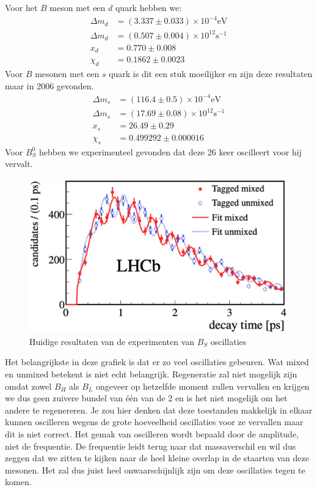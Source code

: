 \documentclass[../main.tex]{subfiles}
\begin{document}
Voor het $B$ meson met een $d$ quark hebben we:
\begin{equation}
    \begin{aligned}
        \label{eq:b_d_resultaten}
        \Delta m_{d} &=(3.337 \pm 0.033) \times 10^{-4} \text{eV} \\
        \Delta m_{d} &=(0.507 \pm 0.004) \times 10^{12} \text{s}^{-1}\\
        x_{d}&=0.770 \pm 0.008 \\
        \chi_{d}&=0.1862 \pm 0.0023
    \end{aligned}
\end{equation}
Voor $B$ mesonen met een $s$ quark is dit een stuk moeilijker en zijn deze resultaten maar in 2006 gevonden.
\begin{equation}
    \begin{aligned}
        \label{eq:b_s_resultaten}
        \Delta m_{s}&=(116.4 \pm 0.5) \times 10^{-4} \text{eV} \\
        \Delta m_{s}&=(17.69 \pm 0.08) \times 10^{12} \text{s}^{-1}\\
        x_{s}&=26.49 \pm 0.29 \\
        \chi_{s}&=0.499292 \pm 0.000016
    \end{aligned}
\end{equation}
Voor $B_S^0$ hebben we experimenteel gevonden dat deze 26 keer oscilleert voor hij vervalt.

\begin{figure}[h]
    \centering
    \includegraphics[width=0.5\linewidth]{meson_mixing_and_oscillations/b_s_osc_res.png}
    \caption{Huidige resultaten van de experimenten van $B_S$ oscillaties}%
    \label{fig:meson_mixing_and_oscillations/b_s_osc_res}
\end{figure}

Het belangrijkste in deze grafiek is dat er zo veel oscillaties gebeuren. Wat mixed en unmixed betekent is niet echt belangrijk. Regeneratie zal niet mogelijk zijn omdat zowel $B_H$ als $B_L$ ongeveer op hetzelfde moment zullen vervallen en krijgen we dus geen zuivere bundel van één van de 2 en is het niet mogelijk om het andere te regenereren.  Je zou hier denken dat deze toestanden makkelijk in elkaar kunnen oscilleren wegens de grote hoeveelheid oscillaties voor ze vervallen maar dit is niet correct. Het gemak van oscilleren wordt bepaald door de amplitude, niet de frequentie. De frequentie leidt terug naar dat massaverschil en wil dus zeggen dat we zitten te kijken naar de heel kleine overlap in de staarten van deze mesonen. Het zal dus juist heel onwaarschijnlijk zijn om deze oscillaties tegen te komen.
\end{document}
